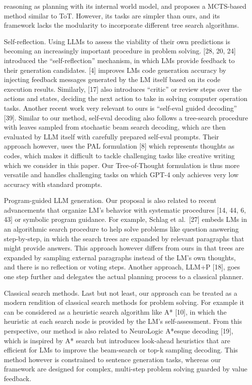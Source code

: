 \documentclass[
]{article}
\begin{document}
reasoning as planning with its internal world model, and proposes a
MCTS-based method similar to ToT. However, its tasks are simpler than
ours, and its framework lacks the modularity to incorporate different
tree search algorithms.

Self-reflection. Using LLMs to assess the viability of their own
predictions is becoming an increasingly important procedure in problem
solving. {[}28, 20, 24{]} introduced the ``self-reflection'' mechanism,
in which LMs provide feedback to their generation candidates. {[}4{]}
improves LMs code generation accuracy by injecting feedback messages
generated by the LM itself based on its code execution results.
Similarly, {[}17{]} also introduces ``critic'' or review steps over the
actions and states, deciding the next action to take in solving computer
operation tasks. Another recent work very relevant to ours is
``self-eval guided decoding'' {[}39{]}. Similar to our method, self-eval
decoding also follows a tree-search procedure with leaves sampled from
stochastic beam search decoding, which are then evaluated by LLM itself
with carefully prepared self-eval prompts. Their approach however, uses
the PAL formulation {[}8{]} which represents thoughts as codes, which
makes it difficult to tackle challenging tasks like creative writing
which we consider in this paper. Our Tree-of-Thought formulation is thus
more versatile and handles challenging tasks on which GPT-4 only
achieves very low accuracy with standard prompts.

Program-guided LLM generation. Our proposal is also related to recent
advancements that organize LM's behavior with systematic procedures
{[}14, 44, 6, 43{]} or symbolic program guidance. For example, Schlag et
al.~{[}27{]} embeds LMs in an algorithmic search procedure to help solve
problems like question answering step-by-step, in which the search trees
are expanded by relevant paragraphs that might provide answers. This
approach however differs from ours in that trees are expanded by
sampling external paragraphs instead of the LM's own thoughts, and there
is no reflection or voting steps. Another approach, LLM+P {[}18{]}, goes
one step further and delegates the actual planning process to a
classical planner.

Classical search methods. Last but not least, our approach can be
treated as a modern rendition of classical search methods for problem
solving. For example it can be considered as a heuristic search
algorithm like A* {[}10{]}, in which the heuristic at each search node
is provided by the LM's self-assessment. From this perspective, our
method is also related to NeuroLogic A*esque decoding {[}19{]}, which is
inspired by A* search but introduces look-ahead heuristics that are
efficient for LMs to improve the beam-search or top-k sampling decoding.
This method however is constrained to sentence generation tasks, whereas
our framework are designed for complex, multi-step problem solving
guarded by value feedback.
\end{document}
